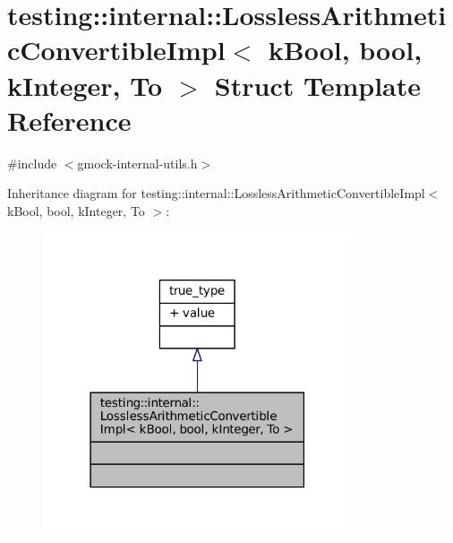 \hypertarget{structtesting_1_1internal_1_1LosslessArithmeticConvertibleImpl_3_01kBool_00_01bool_00_01kInteger_00_01To_01_4}{}\section{testing\+:\+:internal\+:\+:Lossless\+Arithmetic\+Convertible\+Impl$<$ k\+Bool, bool, k\+Integer, To $>$ Struct Template Reference}
\label{structtesting_1_1internal_1_1LosslessArithmeticConvertibleImpl_3_01kBool_00_01bool_00_01kInteger_00_01To_01_4}


{\ttfamily \#include $<$gmock-\/internal-\/utils.\+h$>$}



Inheritance diagram for testing\+:\+:internal\+:\+:Lossless\+Arithmetic\+Convertible\+Impl$<$ k\+Bool, bool, k\+Integer, To $>$\+:
\nopagebreak
\begin{figure}[H]
\begin{center}
\leavevmode
\includegraphics[width=259pt]{structtesting_1_1internal_1_1LosslessArithmeticConvertibleImpl_3_01kBool_00_01bool_00_01kInteger_00_01To_01_4__inherit__graph}
\end{center}
\end{figure}



